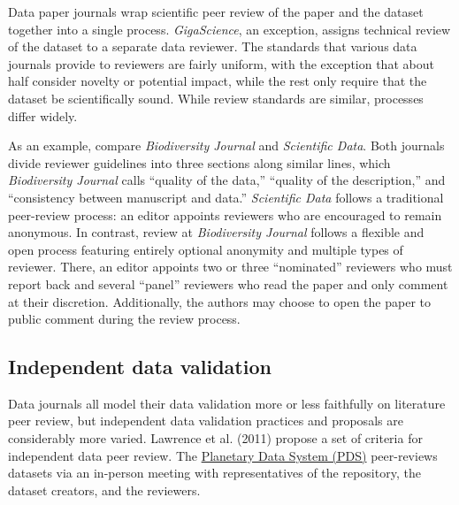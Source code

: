 \documentclass[10pt,a4paper,twocolumn]{article}
\begin{document}
{Data paper journals wrap scientific peer review of the paper and the dataset together into a single process. 
\emph{GigaScience}, an exception, assigns technical review of the dataset to a separate data reviewer.
The standards that various data journals provide to reviewers are fairly uniform, with the exception that about half consider novelty or potential impact, while the rest only require that the dataset be scientifically sound.
While review standards are similar, processes differ widely. 

As an example, compare \emph{Biodiversity Journal} and \emph{Scientific Data}.
Both journals divide reviewer guidelines into three sections along similar lines, which \emph{Biodiversity Journal} calls ``quality of the data,'' ``quality of the description,'' and ``consistency between manuscript and data.''
\emph{Scientific Data} follows a traditional peer-review process: an editor appoints reviewers who are encouraged to remain anonymous.
In contrast, review at \emph{Biodiversity Journal} follows a flexible and open process featuring entirely optional anonymity and multiple types of reviewer.
There, an editor appoints two or three ``nominated'' reviewers who must report back and several ``panel'' reviewers who read the paper and only comment at their discretion.
Additionally, the authors may choose to open the paper to public comment during the review process.

\subsection*{Independent data validation}

Data journals all model their data validation more or less faithfully on literature peer review, but independent data validation practices and proposals are considerably more varied.
Lawrence et al. (2011) propose a set of criteria for independent data peer review.\cite{lawrence_citation_2011}
The \href{https://pds.jpl.nasa.gov/}{Planetary Data System (PDS)} peer-reviews datasets via an in-person meeting with representatives of the repository, the dataset creators, and the reviewers.  

}
\end{document}
